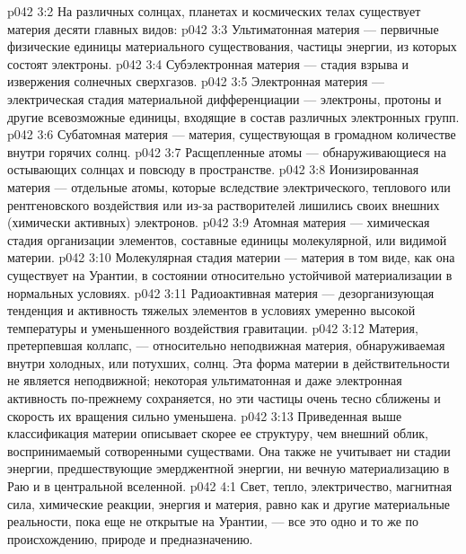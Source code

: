 \vs p042 3:2 На различных солнцах, планетах и космических телах существует материя десяти главных видов:
\vs p042 3:3 \bibnobreakspace Ультиматонная материя --- первичные физические единицы материального существования, частицы энергии, из которых состоят электроны.
\vs p042 3:4 \bibnobreakspace Субэлектронная материя --- стадия взрыва и извержения солнечных сверхгазов.
\vs p042 3:5 \bibnobreakspace Электронная материя --- электрическая стадия материальной дифференциации --- электроны, протоны и другие всевозможные единицы, входящие в состав различных электронных групп.
\vs p042 3:6 \bibnobreakspace Субатомная материя --- материя, существующая в громадном количестве внутри горячих солнц.
\vs p042 3:7 \bibnobreakspace Расщепленные атомы --- обнаруживающиеся на остывающих солнцах и повсюду в пространстве.
\vs p042 3:8 \bibnobreakspace Ионизированная материя --- отдельные атомы, которые вследствие электрического, теплового или рентгеновского воздействия или из\hyp{}за растворителей лишились своих внешних (химически активных) электронов.
\vs p042 3:9 \bibnobreakspace Атомная материя --- химическая стадия организации элементов, составные единицы молекулярной, или видимой материи.
\vs p042 3:10 \bibnobreakspace Молекулярная стадия материи --- материя в том виде, как она существует на Урантии, в состоянии относительно устойчивой материализации в нормальных условиях.
\vs p042 3:11 \bibnobreakspace Радиоактивная материя --- дезорганизующая тенденция и активность тяжелых элементов в условиях умеренно высокой температуры и уменьшенного воздействия гравитации.
\vs p042 3:12 \bibnobreakspace Материя, претерпевшая коллапс, --- относительно неподвижная материя, обнаруживаемая внутри холодных, или потухших, солнц. Эта форма материи в действительности не является неподвижной; некоторая ультиматонная и даже электронная активность по\hyp{}прежнему сохраняется, но эти частицы очень тесно сближены и скорость их вращения сильно уменьшена.
\vs p042 3:13 \pc Приведенная выше классификация материи описывает скорее ее структуру, чем внешний облик, воспринимаемый сотворенными существами. Она также не учитывает ни стадии энергии, предшествующие эмерджентной энергии, ни вечную материализацию в Раю и в центральной вселенной.
\vs p042 4:1 Свет, тепло, электричество, магнитная сила, химические реакции, энергия и материя, равно как и другие материальные реальности, пока еще не открытые на Урантии, --- все это одно и то же по происхождению, природе и предназначению.
